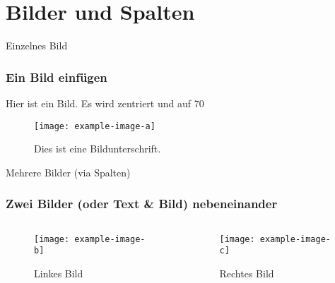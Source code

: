 \documentclass[12pt, aspectratio=169]{beamer}
\begin{document}
\section{Bilder und Spalten}

\begin{frame}{Einzelnes Bild}
    \frametitle{Ein Bild einfügen}
    Hier ist ein Bild. Es wird zentriert und auf 70%
    
    \begin{figure}
        \centering
        \texttt{[image: example-image-a]}
        \caption{Dies ist eine Bildunterschrift.}
    \end{figure}
    
\end{frame}


\begin{frame}{Mehrere Bilder (via Spalten)}
    \frametitle{Zwei Bilder (oder Text \& Bild) nebeneinander}
    
    \begin{columns}[T]
    
        \begin{column}{0.48\textwidth}
            \begin{figure}
                \texttt{[image: example-image-b]}
                \caption{Linkes Bild}
            \end{figure}
        \end{column}
        
        \begin{column}{0.48\textwidth}
            \begin{figure}
                \texttt{[image: example-image-c]}
                \caption{Rechtes Bild}
            \end{figure}
        \end{column}
    \end{columns}
\end{frame}
\end{document}
